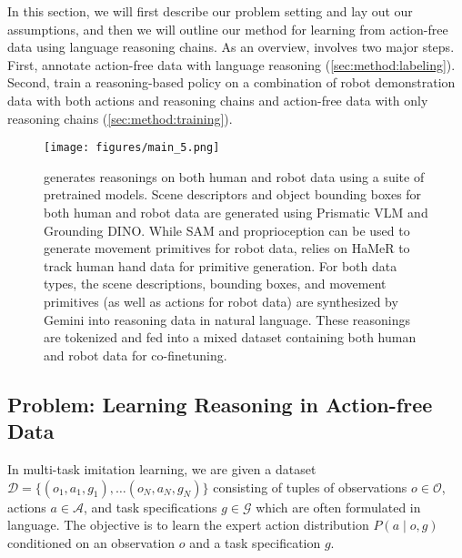 
In this section, we will first describe our problem setting and lay out our assumptions, and then we will outline our method for learning from action-free data using language reasoning chains.
As an overview, \ACRO involves two major steps. First, annotate action-free data with language reasoning (\cref{sec:method:labeling}). Second, train a reasoning-based policy on a combination of robot demonstration data with both actions and reasoning chains and action-free data with only reasoning chains (\cref{sec:method:training}).

\begin{figure*}[!ht]
    \centering
    \texttt{[image: figures/main\_5.png]}
    \caption{\ACRO generates reasonings on both human and robot data using a suite of pretrained models. Scene descriptors and object bounding boxes for both human and robot data are generated using Prismatic VLM and Grounding DINO. While SAM and proprioception can be used to generate movement primitives for robot data, \ACRO relies on HaMeR to track human hand data for primitive generation. For both data types, the scene descriptions, bounding boxes, and movement primitives (as well as actions for robot data) are synthesized by Gemini into reasoning data in natural language. These reasonings are tokenized and fed into a mixed dataset containing both human and robot data for co-finetuning.}
    \label{fig:labeling}
\end{figure*}

\subsection{Problem: Learning Reasoning in Action-free Data}

In multi-task imitation learning, we are given a dataset $\mathcal{D} = \{ (o_1, a_1, g_1),  \ldots (o_N, a_N, g_N) \}$ consisting of tuples of observations $o \in \mathcal{O}$, actions $a \in \mathcal{A}$, and task specifications $g \in \mathcal{G}$ which are often formulated in language. The objective is to learn the expert action distribution $P(a \mid o,g)$ conditioned on an observation $o$ and a task specification $g$.



